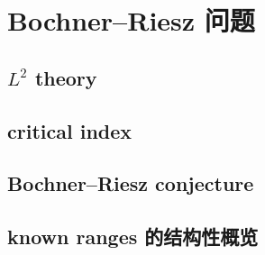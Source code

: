\section{Bochner–Riesz 问题}
\label{b2:sec:2403}


\subsection{\texorpdfstring{\(L^2\)}{L2} theory}
\label{b2:subsec:240301}

\subsection{critical index}
\label{b2:subsec:240302}

\subsection{Bochner–Riesz conjecture}
\label{b2:subsec:240303}

\subsection{known ranges 的结构性概览}
\label{b2:subsec:240304}


